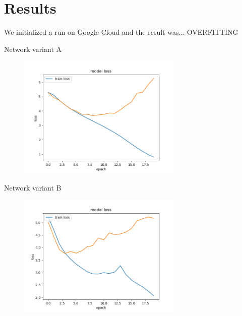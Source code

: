 \documentclass{beamer}
\begin{document}
\section{Results}
\begin{frame}
  We initialized a run on Google Cloud and the result was... OVERFITTING
\end{frame}



\begin{frame}
\centering
Network variant A
\begin{figure}[!h]
\centering
\includegraphics[width=0.7\textwidth]{images/run1_loss_a.png}
\end{figure}
\end{frame}

\begin{frame}
\centering
Network variant B
\begin{figure}[!h]
\centering
\includegraphics[width=0.7\textwidth]{images/run1_loss_b.png}
\end{figure}
\end{frame}
\end{document}
